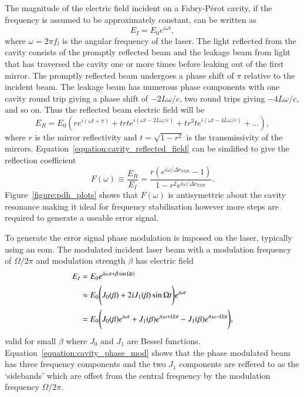 {The magnitude of the electric field incident on a Fabry-P\'erot cavity, if the frequency is assumed to be approximately constant, can be written as
\begin{equation}
E_{I} = E_0 e^{i\omega t},
\end{equation}
where $\omega=2\pi f_l$ is the angular frequency of the laser.
The light reflected from the cavity consists of the promptly reflected beam and the leakage beam from light that has traversed the cavity one or more times before leaking out of the first mirror.
The promptly reflected beam undergoes a phase shift of $\pi$ relative to the incident beam.
The leakage beam has numerous phase components with one cavity round trip giving a phase shift of $-2L\omega/c$, two round trips giving $-4L\omega/c$, and so on.
Thus the reflected beam electric field will be
\begin{equation}\label{equation:cavity_reflected_field}
E_R = E_0 \left( r e^{i\left(\omega t + \pi\right)} + t r t e^{i\left(\omega t -2L\omega/c\right)} + t r^3 t e^{i\left(\omega t -4L\omega/c\right)} + ...\right),
\end{equation}
where $r$ is the mirror reflectivity and $t=\sqrt{1-r^2}$ is the transmissivity of the mirrors.
Equation~\ref{equation:cavity_reflected_field} can be simlified to give the reflection coefficient
\begin{equation}\label{equation:reflection_coefficient}
F(\omega) \equiv \frac{E_R}{E_I} = \frac{r\left(e^{i\omega / \Delta\nu_{FSR}} - 1 \right)}{1-r^2 e^{i\omega / \Delta\nu_{FSR}}}.
\end{equation}
Figure~\ref{figure:pdh_plots} shows that $F(\omega)$ is antisymettric about the cavity resonance making it ideal for frequency stabilisation however more steps are required to generate a useable error signal.

To generate the error signal phase modulation is imposed on the laser, typically using an \gls{eom}.
The modulated incident laser beam with a modulation frequency of $\Omega/2\pi$ and modulation strength $\beta$ has electric field
\begin{align}
E_I &= E_0 e^{i\left(\omega t + \beta \sin\Omega t \right)} \notag \\
&\approx E_0 \Bigg( J_0(\beta) + 2iJ_1(\beta)\sin\Omega t \Bigg)e^{i\omega t} \notag \\
&= E_0 \Bigg( J_0(\beta)e^{i\omega t} + J_1(\beta)e^{i(\omega + \Omega)t} - J_1(\beta)e^{i(\omega - \Omega)t} \Bigg),\label{equation:cavity_phase_mod}
\end{align}
valid for small $\beta$ where $J_0$ and $J_1$ are Bessel functions.
Equation~\ref{equation:cavity_phase_mod} shows that the phase modulated beam has three frequency components and the two $J_1$ components are reffered to as the `sidebands' which are offset from the central frequency by the modulation frequency $\Omega/2\pi$.

}
